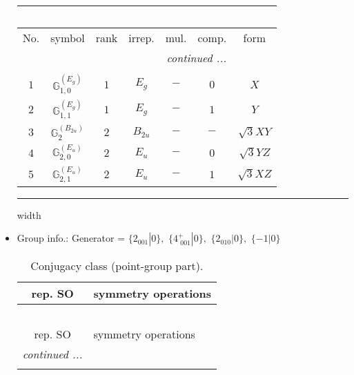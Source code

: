\documentclass[fleqn,10pt,landscape]{article}
\begin{document}
\begin{itemize}
\begin{center}
\begin{longtable}{ccccccc}
\multicolumn{6}{l}{\tablename\ \thetable{}} \\
 \hline \hline
No. & symbol & rank & irrep. & mul. & comp. & form \\ \hline \endhead

 \hline \hline
\multicolumn{6}{r}{\footnotesize\it continued ...} \\ \endfoot

 \hline \hline
\multicolumn{6}{r}{} \\ \endlastfoot

$ 1 $ & $ \mathbb{G}_{1,0}^{(E_{g})} $ & $ 1 $ & $ E_{g} $ & $ - $ & $ 0 $ & $ X $ \\
$ 2 $ & $ \mathbb{G}_{1,1}^{(E_{g})} $ & $ 1 $ & $ E_{g} $ & $ - $ & $ 1 $ & $ Y $ \\ \hline
$ 3 $ & $ \mathbb{G}_{2}^{(B_{2u})} $ & $ 2 $ & $ B_{2u} $ & $ - $ & $ - $ & $ \sqrt{3} X Y $ \\
$ 4 $ & $ \mathbb{G}_{2,0}^{(E_{u})} $ & $ 2 $ & $ E_{u} $ & $ - $ & $ 0 $ & $ \sqrt{3} Y Z $ \\
$ 5 $ & $ \mathbb{G}_{2,1}^{(E_{u})} $ & $ 2 $ & $ E_{u} $ & $ - $ & $ 1 $ & $ \sqrt{3} X Z $ \\
\end{longtable}
\end{center}

 \hfil \hrule height 1mm width \textwidth \hfil

\item Group info.: Generator = $\{2{}_{001}|0\},\,\,\{4^{+}_{\,\,001}|0\},\,\,\{2{}_{010}|0\},\,\,\{-1|0\}$

\begin{center}
\renewcommand{\arraystretch}{1.3}
\begin{longtable}{c|l}
\caption{Conjugacy class (point-group part).}
 \\
 \hline \hline
rep. SO & symmetry operations \\ \hline \endfirsthead

\multicolumn{1}{l}{\tablename\ \thetable{}} \\
 \hline \hline
rep. SO & symmetry operations \\ \hline \endhead

 \hline \hline
\multicolumn{1}{r}{\footnotesize\it continued ...} \\ \endfoot


\end{longtable}
\end{center}
\end{itemize}
\end{document}
